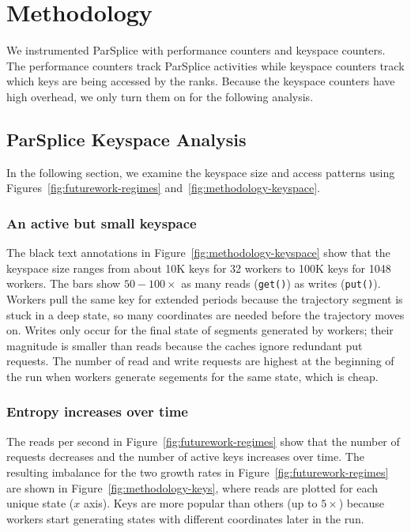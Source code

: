 \section{Methodology}

We instrumented ParSplice with performance counters and keyspace counters.  The
performance counters track ParSplice activities while keyspace counters track
which keys are being accessed by the ranks. Because the keyspace counters have
high overhead, we only turn them on for the following analysis.

\subsection{ParSplice Keyspace Analysis}

In the following section, we examine the keyspace size and access patterns
using Figures~\ref{fig:futurework-regimes} and~\ref{fig:methodology-keyspace}.

\subsubsection*{An active but small keyspace} The black text annotations in
Figure~\ref{fig:methodology-keyspace} show that the keyspace size ranges from
about 10K keys for 32 workers to 100K keys for 1048 workers.  The bars show
\(50-100\times\) as many reads (\texttt{get()}) as writes (\texttt{put()}).
Workers pull the same key for extended periods because the trajectory segment
is stuck in a deep state, so many coordinates are needed before the trajectory
moves on. Writes only occur for the final state of segments generated by
workers; their magnitude is smaller than reads because the caches ignore
redundant put requests. The number of read and write requests are highest at
the beginning of the run when workers generate segements for the same state,
which is cheap.

\subsubsection*{Entropy increases over time} The reads per second in
Figure~\ref{fig:futurework-regimes} show that the number of requests decreases
and the number of active keys increases over time. The resulting imbalance for
the two growth rates in Figure~\ref{fig:futurework-regimes} are shown in
Figure~\ref{fig:methodology-keys}, where reads are plotted for each unique
state (\(x\) axis). Keys are more popular than others (up to \(5\times\))
because workers start generating states with different coordinates later in the
run.

